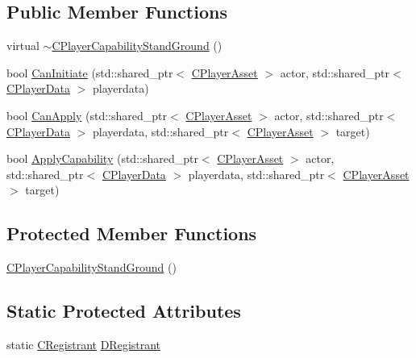 \subsection*{Public Member Functions}
\begin{DoxyCompactItemize}
\item 
virtual \hyperlink{classCPlayerCapabilityStandGround_aa09aba607953849ece673feeb27ef6fd}{$\sim$\+C\+Player\+Capability\+Stand\+Ground} ()
\item 
bool \hyperlink{classCPlayerCapabilityStandGround_a5567bfa47166f4080bd2b86f5c33e29c}{Can\+Initiate} (std\+::shared\+\_\+ptr$<$ \hyperlink{classCPlayerAsset}{C\+Player\+Asset} $>$ actor, std\+::shared\+\_\+ptr$<$ \hyperlink{classCPlayerData}{C\+Player\+Data} $>$ playerdata)
\item 
bool \hyperlink{classCPlayerCapabilityStandGround_a468f2618edaebf2088b5917d2688b6f6}{Can\+Apply} (std\+::shared\+\_\+ptr$<$ \hyperlink{classCPlayerAsset}{C\+Player\+Asset} $>$ actor, std\+::shared\+\_\+ptr$<$ \hyperlink{classCPlayerData}{C\+Player\+Data} $>$ playerdata, std\+::shared\+\_\+ptr$<$ \hyperlink{classCPlayerAsset}{C\+Player\+Asset} $>$ target)
\item 
bool \hyperlink{classCPlayerCapabilityStandGround_a3e1beee9125b2a940f803c3234866bb2}{Apply\+Capability} (std\+::shared\+\_\+ptr$<$ \hyperlink{classCPlayerAsset}{C\+Player\+Asset} $>$ actor, std\+::shared\+\_\+ptr$<$ \hyperlink{classCPlayerData}{C\+Player\+Data} $>$ playerdata, std\+::shared\+\_\+ptr$<$ \hyperlink{classCPlayerAsset}{C\+Player\+Asset} $>$ target)
\end{DoxyCompactItemize}
\subsection*{Protected Member Functions}
\begin{DoxyCompactItemize}
\item 
\hyperlink{classCPlayerCapabilityStandGround_a58f0601edbe114a45ff27b84027afd09}{C\+Player\+Capability\+Stand\+Ground} ()
\end{DoxyCompactItemize}
\subsection*{Static Protected Attributes}
\begin{DoxyCompactItemize}
\item 
static \hyperlink{classCPlayerCapabilityStandGround_1_1CRegistrant}{C\+Registrant} \hyperlink{classCPlayerCapabilityStandGround_a7e89ffa413cea60b2f3c923fe5f44201}{D\+Registrant}
\end{DoxyCompactItemize}

